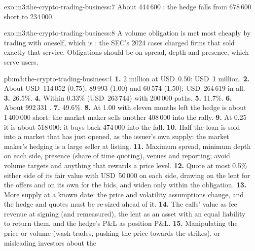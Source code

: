 \begin{solution}{exo:m3:the-crypto-trading-business:7}
About 444\,600 : the hedge falls from 678\,600  short to 234\,000.
\end{solution}

\begin{solution}{exo:m3:the-crypto-trading-business:8}
A volume obligation is met most cheaply by trading with oneself, which is : the SEC's 2024 cases charged firms that sold exactly
that service. Obligations should be on spread, depth and presence, which serve users.
\end{solution}

\begin{solution}{pb:m3:the-crypto-trading-business:1}
\textbf{1.} 2 million  at USD~0.50: USD~1 million. \textbf{2.} About USD~114\,052 (0.75), 89\,993 (1.00) and 60\,574 (1.50); USD~264\,619
in all. \textbf{3.} 26.5\%. \textbf{4.} Within 0.33\% (USD~263\,744) with 200\,000 paths. \textbf{5.} 11.7\%. \textbf{6.} About 992\,331 .
\textbf{7.} 49.6\%. \textbf{8.} At 1.00 with eleven months left the hedge is about 1\,400\,000  short: the market maker sells another 408\,000 into
the rally. \textbf{9.} At 0.25 it is about 518\,000: it buys back 474\,000 into the fall. \textbf{10.} Half the loan is sold into a market that has just
opened, as the issuer's own supply: the market maker's hedging is a large seller at listing. \textbf{11.} Maximum spread, minimum depth on each side, presence
(share of time quoting), venues and reporting; avoid volume targets and anything that rewards a price level. \textbf{12.} Quote at most 0.5\% either side of
its fair value with USD~50\,000 on each side, drawing on the lent  for the offers and on its own  for the bids, and widen only within the
obligation. \textbf{13.} More supply at a known date: the price and volatility assumptions change, and the hedge and quotes must be re-sized ahead of it.
\textbf{14.} The calls' value as fee revenue at signing (and remeasured), the lent  as an asset with an equal liability to return them, and the hedge's
P\&L as position P\&L. \textbf{15.} Manipulating the price or volume (wash trades, pushing the price towards the strikes), or misleading investors about the

\end{solution}
